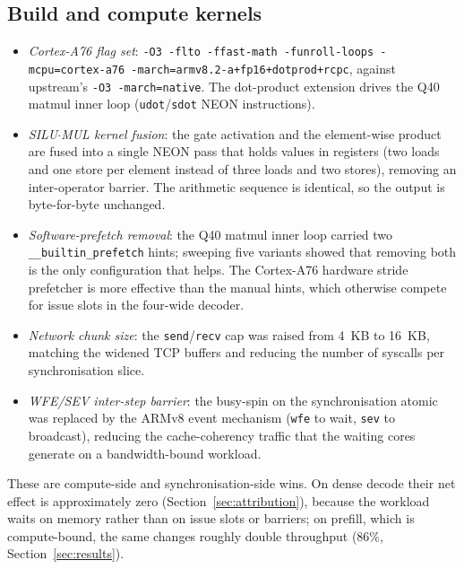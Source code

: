 \documentclass[10pt,a4paper]{article}
\begin{document}
\subsection{Build and compute kernels}
\begin{itemize}
  \item \emph{Cortex-A76 flag set}: \texttt{-O3 -flto -ffast-math -funroll-loops -mcpu=cortex-a76 -march=armv8.2-a+fp16+dotprod+rcpc}, against upstream's \texttt{-O3 -march=native}. The dot-product extension drives the Q40 matmul inner loop (\texttt{udot}/\texttt{sdot} NEON instructions).
  \item \emph{SILU$\cdot$MUL kernel fusion}: the gate activation and the element-wise product are fused into a single NEON pass that holds values in registers (two loads and one store per element instead of three loads and two stores), removing an inter-operator barrier. The arithmetic sequence is identical, so the output is byte-for-byte unchanged.
  \item \emph{Software-prefetch removal}: the Q40 matmul inner loop carried two \texttt{\_\_builtin\_prefetch} hints; sweeping five variants showed that removing both is the only configuration that helps. The Cortex-A76 hardware stride prefetcher is more effective than the manual hints, which otherwise compete for issue slots in the four-wide decoder.
  \item \emph{Network chunk size}: the \texttt{send}/\texttt{recv} cap was raised from 4~KB to 16~KB, matching the widened TCP buffers and reducing the number of syscalls per synchronisation slice.
  \item \emph{WFE/SEV inter-step barrier}: the busy-spin on the synchronisation atomic was replaced by the ARMv8 event mechanism (\texttt{wfe} to wait, \texttt{sev} to broadcast), reducing the cache-coherency traffic that the waiting cores generate on a bandwidth-bound workload.
\end{itemize}
These are compute-side and synchronisation-side wins. On dense decode their net effect is approximately zero (Section~\ref{sec:attribution}), because the workload waits on memory rather than on issue slots or barriers; on prefill, which is compute-bound, the same changes roughly double throughput (86\%, Section~\ref{sec:results}).
\end{document}
